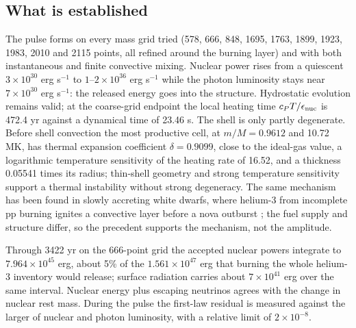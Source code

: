 \subsection{What is established}
The pulse forms on every mass grid tried (578, 666, 848, 1695, 1763, 1899,
1923, 1983, 2010 and 2115 points, all refined around the burning layer) and
with both instantaneous and finite convective mixing. Nuclear power rises
from a quiescent $3\times10^{30}$ erg s$^{-1}$ to $1$--$2\times10^{36}$
erg s$^{-1}$ while the photon luminosity stays near $7\times10^{30}$ erg
s$^{-1}$: the released energy goes into the structure. Hydrostatic evolution
remains valid; at the coarse-grid endpoint the local heating time
$c_PT/\epsilon_{\rm nuc}$ is 472.4 yr against a dynamical time of 23.46 s.
The shell is only partly degenerate. Before shell convection the most
productive cell, at $m/M=0.9612$ and 10.72 MK, has thermal expansion
coefficient $\delta=0.9099$, close to the ideal-gas value, a logarithmic
temperature sensitivity of the heating rate of 16.52, and a thickness
0.05541 times its radius; thin-shell geometry and strong temperature
sensitivity support a thermal instability without strong degeneracy. The
same mechanism has been found in slowly accreting white dwarfs, where
helium-3 from incomplete pp burning ignites a convective layer before a nova
outburst \cite{denissenkov13}; the fuel supply and structure differ, so the
precedent supports the mechanism, not the amplitude.

Through 3422 yr on the 666-point grid the accepted nuclear powers integrate
to $7.964\times10^{45}$ erg, about 5\% of the $1.561\times10^{47}$ erg that
burning the whole helium-3 inventory would release; surface radiation
carries about $7\times10^{41}$ erg over the same interval. Nuclear energy
plus escaping neutrinos agrees with the change in nuclear rest mass. During
the pulse the first-law residual is measured against the larger of nuclear
and photon luminosity, with a relative limit of $2\times10^{-8}$.


